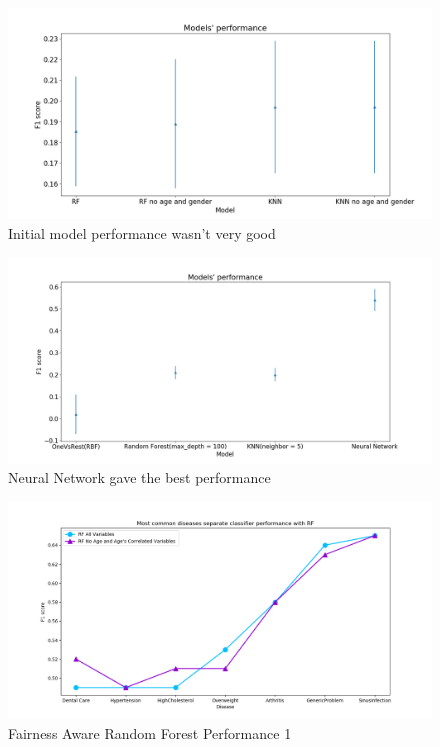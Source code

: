 \documentclass[runningheads]{llncs}
\begin{document}
\begin{figure}[H]
\includegraphics[width=\textwidth,keepaspectratio]{figs/image1.png}
\caption{Initial model performance wasn't very good}
\label{fig:perf1}
\centering
\end{figure}

\begin{figure}[H]
\includegraphics[width=\textwidth,keepaspectratio]{figs/image8.png}
\caption{Neural Network gave the best performance}
\label{fig:perf2}
\centering
\end{figure}

\begin{figure}[H]
\includegraphics[width=\textwidth,keepaspectratio]{figs/image11.png}
\caption{Fairness Aware Random Forest Performance 1}
\label{fig:fai_rn1}
\centering
\end{figure}
\end{document}
